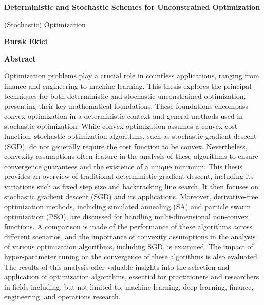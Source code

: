 \thispagestyle{plain}
\begin{center}
    \Large
    \textbf{Deterministic and Stochastic Schemes for Unconstrained Optimization}

    \vspace{0.4cm}
    \large
    (Stochastic) Optimization

    \vspace{0.4cm}
    \textbf{Burak Ekici}

    \vspace{0.9cm}
    \textbf{Abstract}
\end{center}
Optimization problems play a crucial role in countless applications, ranging from finance and engineering to machine learning. This thesis explores the principal techniques for both deterministic and stochastic unconstrained optimization, presenting their key mathematical foundations. These foundations encompass convex optimization in a deterministic context and general methods used in stochastic optimization. While convex optimization assumes a convex cost function, stochastic optimization algorithms, such as stochastic gradient descent (SGD), do not generally require the cost function to be convex. Nevertheless, convexity assumptions often feature in the analysis of these algorithms to ensure convergence guarantees and the existence of a unique minimum.
This thesis provides an overview of traditional deterministic gradient descent, including its variations such as fixed step size and backtracking line search. It then focuses on stochastic gradient descent (SGD) and its applications. Moreover, derivative-free optimization methods, including simulated annealing (SA) and particle swarm optimization (PSO), are discussed for handling multi-dimensional non-convex functions. A comparison is made of the performance of these algorithms across different scenarios, and the importance of convexity assumptions in the analysis of various optimization algorithms, including SGD, is examined. The impact of hyper-parameter tuning on the convergence of these algorithms is also evaluated. The results of this analysis offer valuable insights into the selection and application of optimization algorithms, essential for practitioners and researchers in fields including, but not limited to, machine learning, deep learning, finance, engineering, and operations research.
